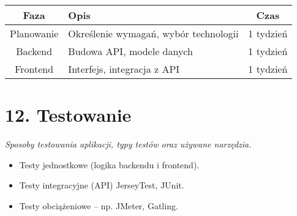 \documentclass[a4paper,12pt]{article}
\begin{document}
\vspace{0.5 cm}
 \noindent
\begin{longtable}{|c|p{8cm}|c|}
\hline
\textbf{Faza} & \textbf{Opis} & \textbf{Czas} \\
\hline
Planowanie & Określenie wymagań, wybór technologii & 1 tydzień \\
\hline
Backend & Budowa API, modele danych & 1 tydzień \\
\hline
Frontend & Interfejs, integracja z API & 1 tydzień \\
\hline
\end{longtable}

\section*{12. Testowanie}
\textit{Sposoby testowania aplikacji, typy testów oraz używane narzędzia.}

\vspace{0.5 cm}
 \noindent
\begin{itemize}
    \item Testy jednostkowe (logika backendu i frontend).
    \item Testy integracyjne (API) JerseyTest, JUnit.
    \item Testy obciążeniowe – np. JMeter, Gatling.
\end{itemize}
\end{document}
